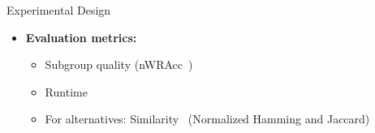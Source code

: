 \documentclass[en, navbaroff]{sdqbeamer}
\begin{document}
\begin{frame}[t]{Experimental Design}
\begin{itemize}
\begin{itemize}
		\end{itemize}
		\pause
		\vspace{\baselineskip}
		\item \textbf{Evaluation metrics:}
		\begin{itemize}
			\item Subgroup quality (nWRAcc~\cite{lavravc1999rule, mathonat2021anytime})
			\item Runtime
			\item For alternatives: Similarity~\cite{choi2010survey} (Normalized Hamming and Jaccard)
		\end{itemize}
	\end{itemize}
\end{frame}
\end{document}
